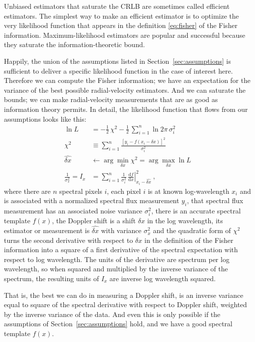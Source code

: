 \documentclass[modern]{aastex631}
\newcommand{\dd}{\mathrm{d}}
\newcommand{\sectionname}{Section}
\newcommand{\secref}[1]{\sectionname~\ref{#1}}
\begin{document}
Unbiased estimators that saturate the CRLB are sometimes called efficient estimators.
The simplest way to make an efficient estimator is to optimize the very likelihood function that appears in the definition \eqref{eq:fisher} of the Fisher information.
Maximum-likelihood estimators are popular and successful because they saturate the information-theoretic bound.

Happily, the union of the assumptions listed in \secref{sec:assumptions} is sufficient to deliver a specific likelihood function in the case of interest here.
Therefore we can compute the Fisher information; we have an expectation for the variance of the best possible radial-velocity estimators.
And we can saturate the bounds; we can make radial-velocity measurements that are as good as information theory permits.
In detail, the likelihood function that flows from our assumptions looks like this:
\begin{align}
    \ln L &= -\frac{1}{2}\,\chi^2 - \frac{1}{2}\,\sum_{i=1}^n \ln 2\pi\,\sigma_i^2\label{eq:lnL}\\
    \chi^2 &\equiv \sum_{i=1}^n \frac{[y_i - f(x_i - \delta x)]^2}{\sigma_i^2}\label{eq:chi2}\\
    \widehat{\delta x} &\leftarrow \arg\min_{\delta x} \chi^2 = \arg\max_{\delta x} \ln L\label{eq:argmin}\\
    \frac{1}{\sigma_x^2} = I_x &= \sum_{i=1}^n\frac{1}{\sigma_i^2}\,\left.\frac{\dd f}{\dd x}\right|_{x_i-\widehat{\delta x}}^2\label{eq:ivar}~,
\end{align}
where there are $n$ spectral pixels $i$,
each pixel $i$ is at known log-wavelength $x_i$ and is associated with a normalized spectral flux measurement $y_i$,
that spectral flux measurement has an associated noise variance $\sigma_i^2$,
there is an accurate spectral template $f(x)$,
the Doppler shift is a shift $\delta x$ in the log wavelength,
its estimator or measurement is $\widehat{\delta x}$ with variance $\sigma_x^2$
and
the quadratic form of $\chi^2$ turns the second derivative with respect to $\delta x$ in the definition of the Fisher information into a square of a first derivative of the spectral expectation with respect to log wavelength.
The units of the derivative are spectrum per log wavelength, so when squared and multiplied by the inverse variance of the spectrum, the resulting units of $I_x$ are inverse log wavelength squared.

That is, the best we can do in measuring a Doppler shift, is an inverse variance equal to square of the spectral derivative with respect to Doppler shift, weighted by the inverse variance of the data.
And even this is only possible if the assumptions of \secref{sec:assumptions} hold, and we have a good spectral template $f(x)$.
\end{document}
